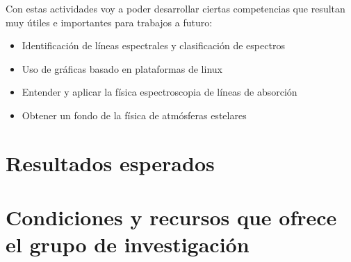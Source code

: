 \documentclass[11pt]{article}
\begin{document}
Con estas actividades voy a poder desarrollar ciertas competencias que resultan muy útiles e importantes para trabajos a futuro:

\begin{itemize}
    \item Identificación de líneas espectrales y clasificación de espectros
    \item Uso de gráficas basado en plataformas de linux
    \item Entender y aplicar la física espectroscopia de líneas de absorción
    \item Obtener un fondo de la física de atmósferas estelares
\end{itemize}


\section{Resultados esperados}

\section{Condiciones y recursos que ofrece el grupo de investigación}
\end{document}
